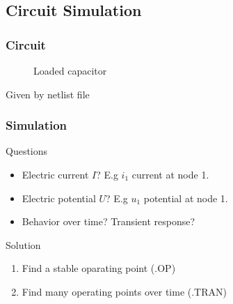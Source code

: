 \subsection{Circuit Simulation}
\begin{frame}
\frametitle{Circuit}
\begin{figure}[ht]
    \centering\scalebox{1.5}{
        \begin{circuitikz}[scale=1.5]
            
        \end{circuitikz}}
    \caption{Loaded capacitor}
\label{fig:cap}
\end{figure}
Given by netlist file
\end{frame}

\begin{frame}
\frametitle{Simulation}
\begin{block}{Questions}
    \begin{itemize}
        \item Electric current \(I\)? E.g \(i_1\) current at node 1.
        \item Electric potential \(U\)? E.g \(u_1\) potential at node 1.
        \item Behavior over time? Transient response?
    \end{itemize}
\end{block}
\begin{block}{Solution}
    \begin{enumerate}
        \item Find a stable oparating point (.OP)
        \item Find many operating points over time (.TRAN)
    \end{enumerate}
\end{block}
\end{frame}

\begin{frame}
    \centering
\end{frame}

